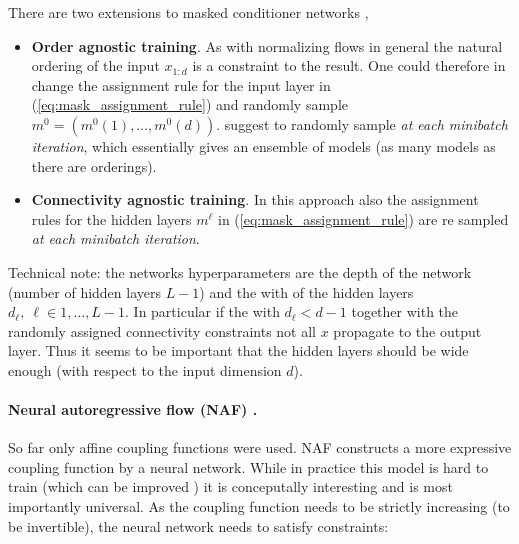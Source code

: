 \documentclass[12pt,a4paper]{article}
\begin{document}
There are two extensions to masked conditioner networks \cite{germain_2015_made}, 
\begin{itemize}
	\item \textbf{Order agnostic training}. As with normalizing flows in general the natural ordering of the input $x_{1:d}$ is a constraint to the result. One could therefore in change the assignment rule for the input layer in (\ref{eq:mask_assignment_rule}) and randomly sample $m^0  = (m^0(1), \dots, m^0(d))$.  \cite{germain_2015_made} suggest to randomly sample \textit{at each minibatch iteration}, which essentially gives an ensemble of models (as many models as there are orderings).
	\item \textbf{Connectivity agnostic training}. In this approach also the assignment rules for the hidden layers $m^\ell$ in (\ref{eq:mask_assignment_rule}) are re sampled \textit{at each minibatch iteration}.
\end{itemize}

Technical note: the networks hyperparameters are the depth of the network (number of hidden layers $L-1$) and the with of the hidden layers $d_\ell, ~\ell \in 1,\dots,L-1$. In particular if the with $d_\ell < d-1$ together with the randomly assigned connectivity constraints not all $x$ propagate to the output layer. Thus it seems to be important that the hidden layers  should be wide enough (with respect to the input dimension $d$).


 
 
\paragraph{Neural autoregressive flow (NAF) \cite{huang_2018_neural_autoregressive_flows}.} 
So far only affine coupling functions were used. NAF constructs a more expressive coupling function by a neural network. While in practice this model is hard to train (which can be improved \cite{cao_2019_block_naf}) it is conceputally interesting and is most importantly universal. As the coupling function needs to be strictly increasing (to be invertible), the neural network needs to
satisfy constraints: 
\end{document}
